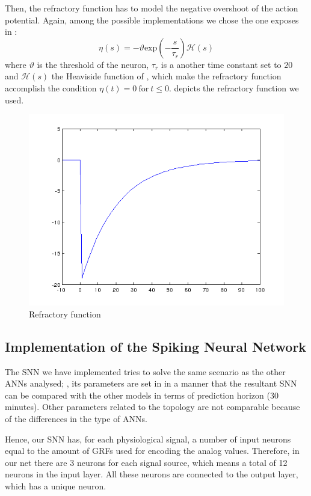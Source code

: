 Then, the refractory function has to model the negative overshoot of the action potential. Again, among the possible implementations we chose the one exposes in 
\cite{booij2004temporal}:
\begin{equation}
\eta(s)=-\vartheta \text{exp}(-\frac{s}{\tau_{r}})\mathcal{H}(s)
\label{eq:refractoryfunction}
\end{equation}
where $\vartheta$ is the threshold of the neuron, $\tau_{r}$ is a another time constant set to $20$ and $\mathcal{H}(s)$ the Heaviside function of , which make the refractory function accomplish the condition $\eta(t)=0~\text{for}~t\leq 0$.  depicts the refractory function we used.
\begin{figure}[!ht]
\centering
\includegraphics[width=0.82\columnwidth]{images/results/refractoryfunction.png}
\caption{Refractory function}
\label{fig:refractoryfunctionPlot}
\end{figure}



\subsection{Implementation of the Spiking Neural Network}
\label{subsec:snnimplementation}
The SNN we have implemented tries to solve the same scenario as the other ANNs analysed; \ie, its parameters are set in in a manner that the resultant SNN can be compared with the other models in terms of prediction horizon (30 minutes). Other parameters related to the topology are not comparable because of the differences in the type of ANNs.

Hence, our SNN has, for each physiological signal, a number of input neurons equal to the amount of GRFs used for encoding the analog values. Therefore, in our net there are 3 neurons for each signal source, which means a total of 12 neurons in the input layer. All these neurons are connected to the output layer, which has a unique neuron.


